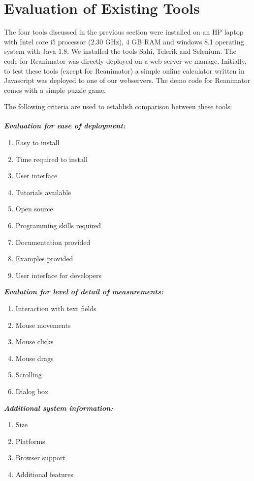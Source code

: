 \documentclass[12pt,journal]{IEEEtran}
\begin{document}
\section{Evaluation of Existing Tools}
The four tools discussed in the previous section were installed on an HP laptop with Intel core i5 processor (2.30 GHz), 4 GB RAM and windows 8.1 operating system with Java 1.8. We installed the tools Sahi, Telerik and Selenium. The code for Reanimator was directly deployed on a web server we manage. Initially, to test these tools (except for Reanimator) a simple online calculator written in Javascript was deployed to one of our webservers. The demo code for Reanimator comes with a simple puzzle game.
\par
The following criteria are used to establish comparison between these tools:\\ \\
\textbf{ \textit{Evaluation for ease of deployment:}}
\begin{enumerate}
\item Easy to install
\item Time required to install
\item User interface
\item Tutorials available
\item Open source
\item Programming skills required
\item Documentation provided
\item Examples provided
\item User interface for developers\\
\end{enumerate}
\textbf{\textit{Evalution for level of detail of measurements:}}
\begin{enumerate}
\item Interaction with text fields
\item Mouse movements
\item Mouse clicks
\item Mouse drags
\item Scrolling
\item Dialog box\\
\end{enumerate}
\textbf{\textit{Additional system information:}}
\begin{enumerate}
\item Size
\item Platforms
\item Browser support
\item Additional features\\
\end{enumerate}
\end{document}
